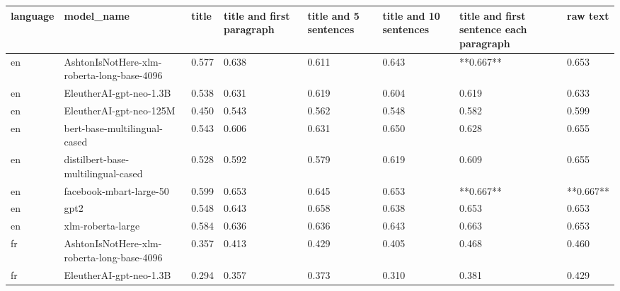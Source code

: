 \begin{tabular}{llllllll}
\toprule
language &                                 model\_name & title & title and first paragraph & title and 5 sentences & title and 10 sentences & title and first sentence each paragraph &  raw text \\
\midrule
      en & AshtonIsNotHere-xlm-roberta-long-base-4096 & 0.577 &                     0.638 &                 0.611 &                  0.643 &                               **0.667** &     0.653 \\
      en &                    EleutherAI-gpt-neo-1.3B & 0.538 &                     0.631 &                 0.619 &                  0.604 &                                   0.619 &     0.633 \\
      en &                    EleutherAI-gpt-neo-125M & 0.450 &                     0.543 &                 0.562 &                  0.548 &                                   0.582 &     0.599 \\
      en &               bert-base-multilingual-cased & 0.543 &                     0.606 &                 0.631 &                  0.650 &                                   0.628 &     0.655 \\
      en &         distilbert-base-multilingual-cased & 0.528 &                     0.592 &                 0.579 &                  0.619 &                                   0.609 &     0.655 \\
      en &                    facebook-mbart-large-50 & 0.599 &                     0.653 &                 0.645 &                  0.653 &                               **0.667** & **0.667** \\
      en &                                       gpt2 & 0.548 &                     0.643 &                 0.658 &                  0.638 &                                   0.653 &     0.653 \\
      en &                          xlm-roberta-large & 0.584 &                     0.636 &                 0.636 &                  0.643 &                                   0.663 &     0.653 \\
      fr & AshtonIsNotHere-xlm-roberta-long-base-4096 & 0.357 &                     0.413 &                 0.429 &                  0.405 &                                   0.468 &     0.460 \\
      fr &                    EleutherAI-gpt-neo-1.3B & 0.294 &                     0.357 &                 0.373 &                  0.310 &                                   0.381 &     0.429 \\

\end{tabular}
